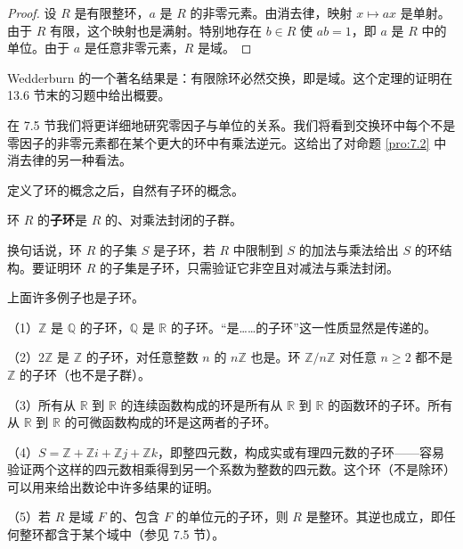 \begin{proof}
设 \(R\) 是有限整环，\(a\) 是 \(R\) 的非零元素。由消去律，映射 \(x \mapsto ax\) 是单射。由于 \(R\) 有限，这个映射也是满射。特别地存在 \(b \in R\) 使 \(ab = 1\)，即 \(a\) 是 \(R\) 中的单位。由于 \(a\) 是任意非零元素，\(R\) 是域。
\end{proof}

Wedderburn 的一个著名结果是：有限除环必然交换，即是域。这个定理的证明在 13.6 节末的习题中给出概要。

在 7.5 节我们将更详细地研究零因子与单位的关系。我们将看到交换环中每个不是零因子的非零元素都在某个更大的环中有乘法逆元。这给出了对命题 \ref{pro:7.2} 中消去律的另一种看法。

定义了环的概念之后，自然有子环的概念。

\begin{definition}
环 \(R\) 的\textbf{子环}是 \(R\) 的、对乘法封闭的子群。
\end{definition}

换句话说，环 \(R\) 的子集 \(S\) 是子环，若 \(R\) 中限制到 \(S\) 的加法与乘法给出 \(S\) 的环结构。要证明环 \(R\) 的子集是子环，只需验证它非空且对减法与乘法封闭。

\begin{example}
上面许多例子也是子环。

（1）\(\mathbb{Z}\) 是 \(\mathbb{Q}\) 的子环，\(\mathbb{Q}\) 是 \(\mathbb{R}\) 的子环。“是……的子环”这一性质显然是传递的。

（2）\(2\mathbb{Z}\) 是 \(\mathbb{Z}\) 的子环，对任意整数 \(n\) 的 \(n\mathbb{Z}\) 也是。环 \(\mathbb{Z}/n\mathbb{Z}\) 对任意 \(n \geq 2\) 都不是 \(\mathbb{Z}\) 的子环（也不是子群）。

（3）所有从 \(\mathbb{R}\) 到 \(\mathbb{R}\) 的连续函数构成的环是所有从 \(\mathbb{R}\) 到 \(\mathbb{R}\) 的函数环的子环。所有从 \(\mathbb{R}\) 到 \(\mathbb{R}\) 的可微函数构成的环是这两者的子环。

（4）\(S = \mathbb{Z} + \mathbb{Z}i + \mathbb{Z}j + \mathbb{Z}k\)，即整四元数，构成实或有理四元数的子环——容易验证两个这样的四元数相乘得到另一个系数为整数的四元数。这个环（不是除环）可以用来给出数论中许多结果的证明。

（5）若 \(R\) 是域 \(F\) 的、包含 \(F\) 的单位元的子环，则 \(R\) 是整环。其逆也成立，即任何整环都含于某个域中（参见 7.5 节）。
\end{example}

